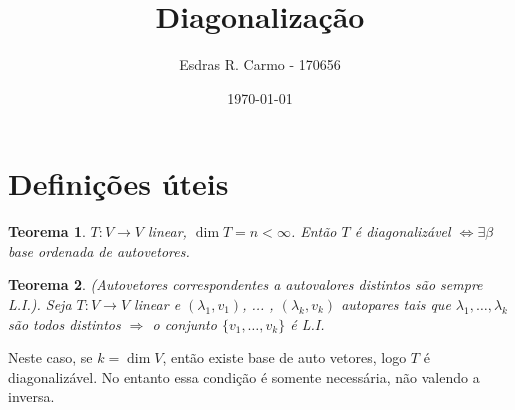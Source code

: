 \documentclass{article}
\author{Esdras R. Carmo - 170656}
\title{Diagonalização}
\date{\today}
\newcommand{\deffunc}[3] {#1: #2 \longrightarrow #3}
\newtheorem{theorem}{Teorema}[section]
\begin{document}
    \maketitle

    \section{Definições úteis}
        \begin{theorem}
            $\deffunc{T}{V}{V}$ linear, $\dim T = n < \infty$. Então $T$ é diagonalizável $\Leftrightarrow \exists \beta$ base
            ordenada de autovetores.
        \end{theorem}

        \begin{theorem}
            (Autovetores correspondentes a autovalores distintos são sempre L.I.). Seja $\deffunc{T}{V}{V}$ linear e $(\lambda_1, v_1)$, ... ,
            $(\lambda_k, v_k)$ autopares tais que $\lambda_1, \dots, \lambda_k$ são todos distintos $\Rightarrow$ o conjunto
            $\{v_1, \dots, v_k\}$ é L.I.
        \end{theorem}

        Neste caso, se $k = \dim V$, então existe base de auto vetores, logo $T$ é diagonalizável. No entanto essa condição é somente necessária,
        não valendo a inversa.
\end{document}
